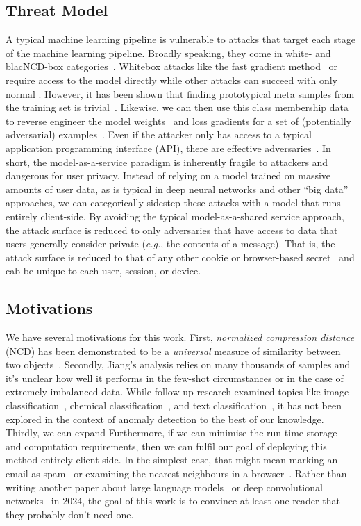 \documentclass[conference]{IEEEtran}
\begin{document}
\subsection{Threat Model}
\label{threat}

A typical machine learning pipeline is vulnerable to attacks that target each stage of the machine learning pipeline. Broadly speaking, they come in white- and blacNCD-box categories~\cite{meyers}. Whitebox attacks like the fast gradient method~\cite{fgm} or~\cite{deepfool} require access to the model directly while other attacks can succeed with only normal . However, it has been shown that finding prototypical meta samples from the training set is trivial~\cite{chakraborty_adversarial_2018}. Likewise, we can then use this class membership data to reverse engineer the model weights~\cite{} and loss gradients for a set of (potentially adversarial) examples~\cite{}. Even if the attacker only has access to a typical application programming interface (API), there are effective adversaries~\cite{hopskipjump}. In short, the model-as-a-service paradigm is inherently fragile to attackers and dangerous for user privacy. Instead of relying on a model trained on massive amounts of user data, as is typical in deep neural networks and other ``big data'' approaches, we can categorically sidestep these attacks with a model that runs entirely client-side. By avoiding the typical model-as-a-shared service approach, the attack surface is reduced to only adversaries that have access to data that users generally consider private (\textit{e.g.}, the contents of a message). That is, the attack surface is reduced to that of any other cookie or browser-based secret~\cite{} and cab be unique to each user, session, or device.



\subsection{Motivations} 

We have several motivations for this work. 
First, \textit{normalized compression distance} (NCD) has been demonstrated to be a \textit{universal} measure of similarity between two objects~\cite{ncd}.
Secondly, Jiang's analysis relies on many thousands of samples and it's unclear how well it performs in the few-shot circumstances or in the case of extremely imbalanced data.
While follow-up research examined topics like image classification~\cite{opitz2023gzip}, chemical classification~\cite{weinreich2023parameter}, and text classification~\cite{nishida2011tweet}, it has not been explored in the context of anomaly detection to the best of our knowledge.
Thirdly, we can expand 
Furthermore, if we can minimise the run-time storage and computation requirements, then we can fulfil our goal of deploying this method entirely client-side.
In the simplest case, that might mean marking an email as spam~\cite{} or examining the nearest neighbours in a browser~\cite{}. Rather than writing another paper about large language models~\cite{} or deep convolutional networks~\cite{} in 2024, the goal of this work is to convince at least one reader that they probably don't need one.
\end{document}
